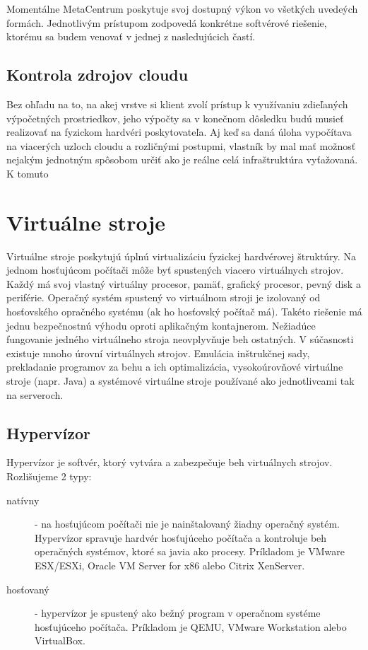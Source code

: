 \documentclass[11pt,final,oneside]{fithesis}
\begin{document}
Momentálne MetaCentrum poskytuje svoj dostupný výkon vo všetkých uvedeých formách. Jednotlivým prístupom zodpovedá konkrétne softvérové riešenie, ktorému sa budem venovať v jednej z nasledujúcich častí.

\subsection{Kontrola zdrojov cloudu}
Bez ohľadu na to, na akej vrstve si klient zvolí prístup k využívaniu zdieľaných výpočetných prostriedkov, jeho výpočty sa v konečnom dôsledku budú musieť realizovať na fyzickom hardvéri poskytovateľa. 
Aj keď sa daná úloha vypočítava na viacerých uzloch cloudu a rozličnými postupmi, vlastník by mal mať možnosť nejakým jednotným spôsobom určiť ako je reálne celá infraštruktúra vyťažovaná. K tomuto

\section{Virtuálne stroje}
Virtuálne stroje poskytujú úplnú virtualizáciu fyzickej hardvérovej štruktúry. Na jednom hosťujúcom počítači môže byť spustených viacero virtuálnych strojov. Každý má svoj vlastný virtuálny procesor, pamäť, grafický procesor, pevný disk 
a periférie. Operačný systém spustený vo virtuálnom stroji je izolovaný od hosťovského opračného systému (ak ho hosťovský počítač má). Takéto riešenie má jednu bezpečnostnú výhodu oproti aplikačným 
kontajnerom. Nežiadúce fungovanie jedného virtuálneho stroja neovplyvňuje beh ostatných.
V súčasnosti existuje mnoho úrovní virtuálnych strojov. Emulácia inštrukčnej sady, prekladanie programov za behu a ich optimalizácia, vysokoúrovňové virtuálne stroje (napr. Java) a systémové virtuálne stroje používané ako
jednotlivcami tak na serveroch.

\subsection{Hypervízor}
Hypervízor je softvér, ktorý vytvára a zabezpečuje beh virtuálnych strojov. Rozlišujeme 2 typy:
\begin{description}
\item[natívny] - na hosťujúcom počítači nie je nainštalovaný žiadny operačný systém. Hypervízor spravuje hardvér hosťujúceho počítača a kontroluje beh operačných systémov, ktoré sa javia ako procesy.
Príkladom je VMware ESX/ESXi, Oracle VM Server for x86 alebo Citrix XenServer.
\item[hosťovaný] - hypervízor je spustený ako bežný program v operačnom systéme hosťujúceho počítača. Príkladom je QEMU, VMware Workstation alebo VirtualBox.
\end{description}
\cite{hypervisorTypes}
\end{document}
